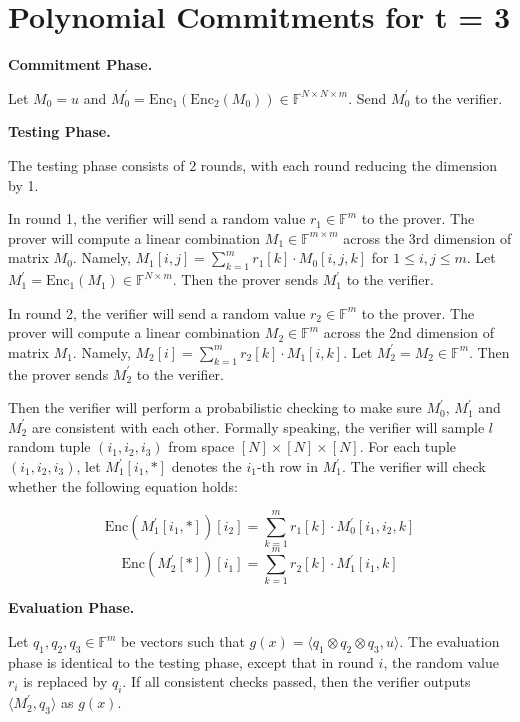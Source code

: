 \section{Polynomial Commitments for t = 3}

\textbf{Commitment Phase.}

Let $M_0 = u$ and $M_0^{\prime} = \text{Enc}_1(\text{Enc}_2(M_0)) \in \mathbb{F}^{N \times N \times m}$. Send $M_0^{\prime}$ to the verifier.

\textbf{Testing Phase.}

The testing phase consists of $2$ rounds, with each round reducing the dimension by 1.

In round 1, the verifier will send a random value $r_1 \in \mathbb{F}^m$ to the prover.
The prover will compute a linear combination $M_1 \in \mathbb{F}^{m \times m}$ across the 3rd dimension of matrix $M_0$.
Namely, $M_1[i,j] = \sum_{k=1}^{m} r_1[k] \cdot M_0[i,j,k]$ for $1 \le i, j \le m$. 
Let $M_1^\prime = \text{Enc}_1(M_1) \in \mathbb{F}^{N \times m}$.
Then the prover sends $M_1^\prime$ to the verifier.

In round 2, the verifier will send a random value $r_2 \in \mathbb{F}^m$ to the prover.
The prover will compute a linear combination $M_2 \in \mathbb{F}^{m}$ across the 2nd dimension of matrix $M_1$.
Namely, $M_2[i] = \sum_{k=1}^{m} r_2[k] \cdot M_1[i, k]$. 
Let $M_2^\prime = M_2 \in \mathbb{F}^{m}$.
Then the prover sends $M_2^\prime$ to the verifier.

Then the verifier will perform a probabilistic checking to make sure $M_0^\prime $, $ M_1^\prime$ and $M_2^\prime$ are consistent with each other. Formally speaking, the verifier will sample $l$ random tuple $(i_1, i_2, i_3)$ from space $[N] \times [N] \times [N]$. 
For each tuple $(i_1, i_2, i_3)$, let $M_1^\prime[i_1, *]$ denotes the $i_1$-th row in $M_1^\prime$.
The verifier will check whether the following equation holds:

$$
    \text{Enc}(M_1^\prime[i_1, *])[i_2] = \sum_{k=1}^m r_1[k] \cdot M_0^{\prime}[i_1,i_2,k]
$$
$$
    \text{Enc}(M_2^\prime[*])[i_1] = \sum_{k=1}^m r_2[k] \cdot M_1^{\prime}[i_1,k]
$$

\textbf{Evaluation Phase.}

Let $q_1, q_2, q_3 \in \mathbb{F}^{m}$ be vectors such that $g(x) =\langle q_1 \otimes q_2 \otimes q_3, u \rangle $. The evaluation phase is identical to the testing phase, except that in round $i$, the random value $r_i$ is replaced by $q_i$. If all consistent checks passed, then the verifier outputs $\langle M_{2}^\prime, q_3 \rangle$ as $g(x)$.

